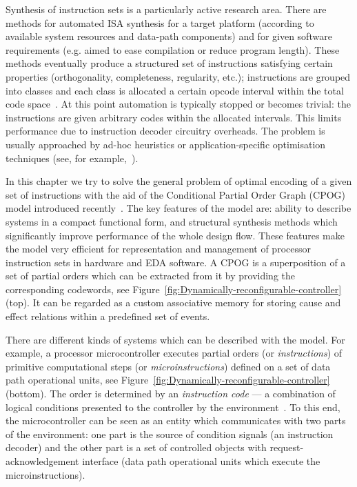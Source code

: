 Synthesis of instruction sets is a particularly active research area.
There are methods for automated ISA synthesis for a target platform
(according to available system resources and data-path components)
and for given software requirements (e.g. aimed to ease compilation
or reduce program length). These methods eventually produce a structured
set of instructions satisfying certain properties (orthogonality,
completeness, regularity, etc.); instructions are grouped into classes
and each class is allocated a certain opcode interval within the total
code space~\cite{2003_nohl_dac}. At this point automation is typically
stopped or becomes trivial: the instructions are given arbitrary codes
within the allocated intervals. This limits performance due to instruction
decoder circuitry overheads. The problem is usually approached by
ad-hoc heuristics or application-specific optimisation techniques
(see, for example,~\cite{2002_lee_iccad}).

In this chapter we try to solve the general problem of optimal encoding
of a given set of instructions with the aid of the Conditional Partial
Order Graph (CPOG) model introduced recently~\cite{2009_mokhov_phd}\cite{2010_mokhov_ieee}.
The key features of the model are: ability to describe systems in
a compact functional form, and structural synthesis methods which
significantly improve performance of the whole design flow. These
features make the model very efficient for representation and management
of processor instruction sets in hardware and EDA software. A CPOG
is a superposition of a set of partial orders which can be extracted
from it by providing the corresponding codewords, see Figure~\ref{fig:Dynamically-reconfigurable-controller}
(top). It can be regarded as a custom associative memory for storing
cause and effect relations within a predefined set of events.

There are different kinds of systems which can be described with the
model. For example, a processor microcontroller executes partial orders
(or \emph{instructions}) of primitive computational steps (or \emph{microinstructions})
defined on a set of data path operational units, see Figure~\ref{fig:Dynamically-reconfigurable-controller}
(bottom). The order is determined by an \emph{instruction code} --- 
a combination of logical conditions presented
to the controller by the environment~\cite{1994_de_micheli_book}.
To this end, the microcontroller can be seen as an entity which communicates
with two parts of the environment: one part is the source of condition
signals (an instruction decoder) and the other part is a set of controlled
objects with request-acknowledgement interface (data path operational
units which execute the microinstructions).

